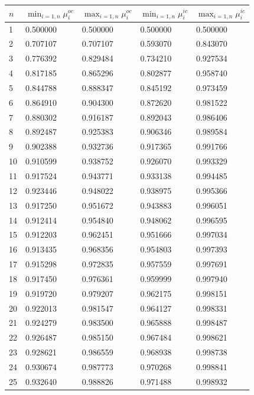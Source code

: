 \begin{figure}[htbp]
\begin{center}
\begin{tiny}
\begin{tabular}{|l|l|l|l|l|}
\hline
$n$ & $\min_{i=1,n}\mu_i^{oc}$ & $\max_{i=1,n}\mu_i^{oc}$ & $\min_{i=1,n}\mu_i^{ic}$ & $\max_{i=1,n}\mu_i^{ic}$ \\
\hline
1 & 0.500000 & 0.500000 & 0.500000 & 0.500000\\
2 & 0.707107 & 0.707107 & 0.593070 & 0.843070\\
3 & 0.776392 & 0.829484 & 0.734210 & 0.927534\\
4 & 0.817185 & 0.865296 & 0.802877 & 0.958740\\
5 & 0.844788 & 0.888347 & 0.845192 & 0.973459\\
6 & 0.864910 & 0.904300 & 0.872620 & 0.981522\\
7 & 0.880302 & 0.916187 & 0.892043 & 0.986406\\
8 & 0.892487 & 0.925383 & 0.906346 & 0.989584\\
9 & 0.902388 & 0.932736 & 0.917365 & 0.991766\\
10 & 0.910599 & 0.938752 & 0.926070 & 0.993329\\
11 & 0.917524 & 0.943771 & 0.933138 & 0.994485\\
12 & 0.923446 & 0.948022 & 0.938975 & 0.995366\\
13 & 0.917250 & 0.951672 & 0.943883 & 0.996051\\
14 & 0.912414 & 0.954840 & 0.948062 & 0.996595\\
15 & 0.912203 & 0.962451 & 0.951666 & 0.997034\\
16 & 0.913435 & 0.968356 & 0.954803 & 0.997393\\
17 & 0.915298 & 0.972835 & 0.957559 & 0.997691\\
18 & 0.917450 & 0.976361 & 0.959999 & 0.997940\\
19 & 0.919720 & 0.979207 & 0.962175 & 0.998151\\
20 & 0.922013 & 0.981547 & 0.964127 & 0.998331\\
21 & 0.924279 & 0.983500 & 0.965888 & 0.998487\\
22 & 0.926487 & 0.985150 & 0.967484 & 0.998621\\
23 & 0.928621 & 0.986559 & 0.968938 & 0.998738\\
24 & 0.930674 & 0.987773 & 0.970268 & 0.998841\\
25 & 0.932640 & 0.988826 & 0.971488 & 0.998932\\

\end{tabular}
\end{tiny}
\end{center}
\end{figure}
